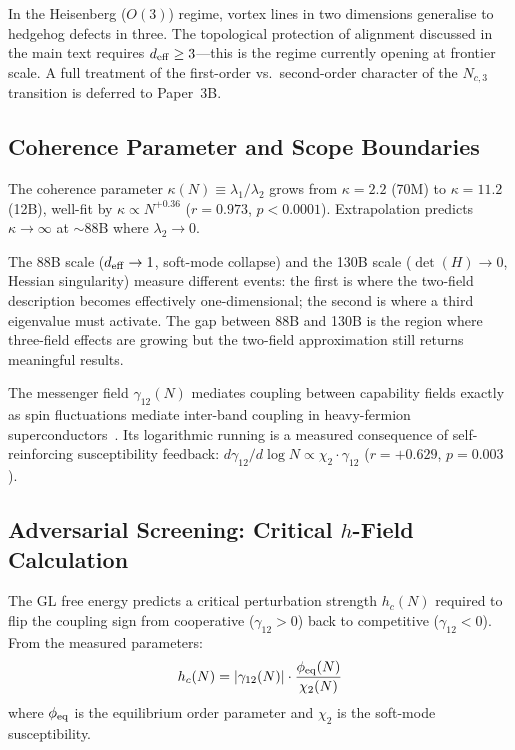 \documentclass[11pt]{article}
\begin{document}
In the Heisenberg ($O(3)$) regime, vortex lines in two dimensions generalise to hedgehog defects in three.
The topological protection of alignment discussed in the main text requires $d_{\rm eff} \geq 3$---this is the regime currently opening at frontier scale.
A full treatment of the first-order vs.\ second-order character of the $N_{c,3}$ transition is deferred to Paper~3B.

\subsection{Coherence Parameter and Scope Boundaries}

The coherence parameter $\kappa(N) \equiv \lambda_1/\lambda_2$ grows from $\kappa=2.2$ (70M) to $\kappa=11.2$ (12B), well-fit by $\kappa \propto N^{+0.36}$ ($r=0.973$, $p<0.0001$).
Extrapolation predicts $\kappa\to\infty$ at $\sim$88B where $\lambda_2\to0$.

The 88B scale ($d_{\rm eff}\to 1$, soft-mode collapse) and the 130B scale ($\det(H)\to 0$, Hessian singularity) measure different events: the first is where the two-field description becomes effectively one-dimensional; the second is where a third eigenvalue must activate.
The gap between 88B and 130B is the region where three-field effects are growing but the two-field approximation still returns meaningful results.

The messenger field $\gamma_{12}(N)$ mediates coupling between capability fields exactly as spin fluctuations mediate inter-band coupling in heavy-fermion superconductors~\cite{amin2020}.
Its logarithmic running is a measured consequence of self-reinforcing susceptibility feedback: $d\gamma_{12}/d\log N \propto \chi_2 \cdot \gamma_{12}$ ($r=+0.629$, $p=0.003$).

\subsection{Adversarial Screening: Critical $h$-Field Calculation}

The GL free energy predicts a critical perturbation strength $h_c(N)$ required to flip the coupling sign from cooperative ($\gamma_{12}>0$) back to competitive ($\gamma_{12}<0$).
From the measured parameters:
\begin{equation}
  h_c(N) = |\gamma_{12}(N)| \cdot \frac{\phi_{\rm eq}(N)}{\chi_2(N)}
\end{equation}
where $\phi_{\rm eq}$ is the equilibrium order parameter and $\chi_2$ is the soft-mode susceptibility.
\end{document}
